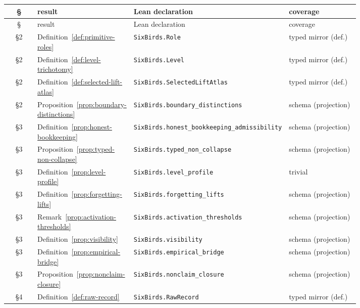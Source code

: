 \documentclass[11pt]{article}
\theoremstyle{definition}
\begin{document}
{\footnotesize
\begin{longtable}{@{}c >{\raggedright\arraybackslash}p{0.27\linewidth} >{\raggedright\arraybackslash}p{0.34\linewidth} >{\raggedright\arraybackslash}p{0.20\linewidth}@{}}
\toprule
\S & result & Lean declaration & coverage \\
\midrule
\endfirsthead
\toprule
\S & result & Lean declaration & coverage \\
\midrule
\endhead
\bottomrule
\endfoot
§2 & Definition~\ref{def:primitive-roles} & \texttt{SixBirds.\allowbreak Role} & typed mirror (def.) \\
§2 & Definition~\ref{def:level-trichotomy} & \texttt{SixBirds.\allowbreak Level} & typed mirror (def.) \\
§2 & Definition~\ref{def:selected-lift-atlas} & \texttt{SixBirds.\allowbreak SelectedLiftAtlas} & typed mirror (def.) \\
§2 & Proposition~\ref{prop:boundary-distinctions} & \texttt{SixBirds.\allowbreak boundary\_\allowbreak distinctions} & schema (projection) \\
§3 & Definition~\ref{prop:honest-bookkeeping} & \texttt{SixBirds.\allowbreak honest\_\allowbreak bookkeeping\_\allowbreak admissibility} & schema (projection) \\
§3 & Proposition~\ref{prop:typed-non-collapse} & \texttt{SixBirds.\allowbreak typed\_\allowbreak non\_\allowbreak collapse} & schema (projection) \\
§3 & Definition~\ref{prop:level-profile} & \texttt{SixBirds.\allowbreak level\_\allowbreak profile} & trivial \\
§3 & Definition~\ref{prop:forgetting-lifts} & \texttt{SixBirds.\allowbreak forgetting\_\allowbreak lifts} & schema (projection) \\
§3 & Remark~\ref{prop:activation-thresholds} & \texttt{SixBirds.\allowbreak activation\_\allowbreak thresholds} & schema (projection) \\
§3 & Definition~\ref{prop:visibility} & \texttt{SixBirds.\allowbreak visibility} & schema (projection) \\
§3 & Definition~\ref{prop:empirical-bridge} & \texttt{SixBirds.\allowbreak empirical\_\allowbreak bridge} & schema (projection) \\
§3 & Proposition~\ref{prop:nonclaim-closure} & \texttt{SixBirds.\allowbreak nonclaim\_\allowbreak closure} & schema (projection) \\
§4 & Definition~\ref{def:raw-record} & \texttt{SixBirds.\allowbreak RawRecord} & typed mirror (def.) \\

\end{longtable}}
\end{document}

